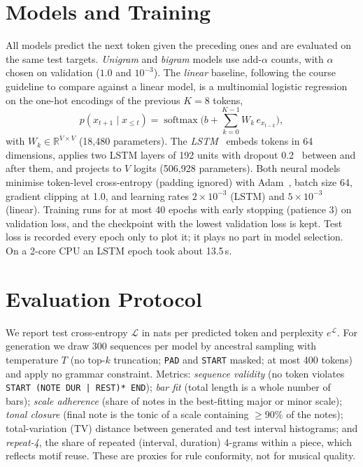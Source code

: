 \documentclass[conference]{IEEEtran}
\begin{document}
\section{Models and Training}
All models predict the next token given the preceding ones and are evaluated on the same
test targets. \emph{Unigram} and \emph{bigram} models use add-$\alpha$ counts, with
$\alpha$ chosen on validation ($1.0$ and $10^{-3}$). The \emph{linear} baseline, following the
course guideline to compare against a linear model, is a multinomial logistic regression on
the one-hot encodings of the previous $K{=}8$ tokens,
\begin{equation}
p(x_{t+1}\mid x_{\le t}) = \operatorname{softmax}\Big(b + \textstyle\sum_{k=0}^{K-1} W_k\, e_{x_{t-k}}\Big),
\end{equation}
with $W_k\in\mathbb{R}^{V\times V}$ (18{,}480 parameters). The \emph{LSTM}~\cite{hochreiter1997}
embeds tokens in 64 dimensions, applies two LSTM layers of 192 units with dropout
0.2~\cite{srivastava2014} between and after them, and projects to $V$ logits
(506{,}928 parameters). Both neural models minimise token-level cross-entropy (padding
ignored) with Adam~\cite{kingma2015}, batch size 64, gradient clipping at 1.0, and learning
rates $2{\times}10^{-3}$ (LSTM) and $5{\times}10^{-3}$ (linear). Training runs for at most
40 epochs with early stopping (patience 3) on validation loss, and the checkpoint with the
lowest validation loss is kept. Test loss is recorded every epoch only to plot it; it plays
no part in model selection. On a 2-core CPU an LSTM epoch took about 13.5\,s.

\section{Evaluation Protocol}
We report test cross-entropy $\mathcal{L}$ in nats per predicted token and perplexity
$e^{\mathcal{L}}$. For generation we draw 300 sequences per model by ancestral sampling with
temperature $T$ (no top-$k$ truncation; \texttt{PAD} and \texttt{START} masked; at most 400
tokens) and apply no grammar constraint. Metrics: \emph{sequence validity} (no token violates
\texttt{START (NOTE DUR | REST)* END}); \emph{bar fit} (total length is a whole number of
bars); \emph{scale adherence} (share of notes in the best-fitting major or minor scale);
\emph{tonal closure} (final note is the tonic of a scale containing ${\ge}90\%$ of the notes);
total-variation (TV) distance between generated and test interval histograms; and
\emph{repeat-4}, the share of repeated (interval, duration) 4-grams within a piece, which
reflects motif reuse. These are proxies for rule conformity, not for musical quality.
\end{document}
